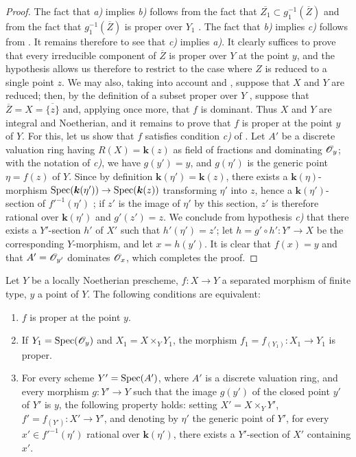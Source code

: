 \begin{proof}
The fact that \emph{a)} implies \emph{b)} follows from the fact that $\overline{Z_1}\subset g_1^{-1}(\overline{Z})$ and from the fact that $g_1^{-1}(\overline{Z})$ is proper over $Y_1$ .
The fact that \emph{b)} implies \emph{c)} follows from .
It remains therefore to see that \emph{c)} implies \emph{a)}.
It clearly suffices to prove that every irreducible component of $\overline{Z}$ is proper over $Y$ at the point $y$, and the hypothesis allows us therefore to restrict to the case where $Z$ is reduced to a single point $z$.
We may also, taking into account  and , suppose that $X$ and $Y$ are reduced; then, by the definition of a subset proper over $Y$ , suppose that $\overline{Z}=X=\overline{\{z\}}$ and, applying  once more, that $f$ is dominant. Thus $X$ and $Y$ are integral and Noetherian, and it remains to prove that $f$ is proper at the point $y$ of $Y$. For this, let us show that $f$ satisfies condition \emph{c)} of .
Let $A'$ be a discrete valuation ring having $R(X)=\boldsymbol{k}(z)$ as field of fractions and dominating $\mathscr{O}_y$; with the notation of \emph{c)}, we have $g(y')=y$, and $g(\eta')$ is the generic point $\eta=f(z)$ of $Y$.
Since by definition $\boldsymbol{k}(\eta')=\boldsymbol{k}(z)$, there exists a $\boldsymbol{k}(\eta)$-morphism $\operatorname{Spec}(\boldsymbol{k}(\eta'))\to\operatorname{Spec}(\boldsymbol{k}(z))$ transforming $\eta'$ into $z$, hence a $\boldsymbol{k}(\eta')$-section of $f'^{-1}(\eta')$ ; if $z'$ is the image of $\eta'$ by this section, $z'$ is therefore rational over $\boldsymbol{k}(\eta')$ and $g'(z')=z$.
We conclude from hypothesis \emph{c)} that there exists a $Y'$-section $h'$ of $X'$ such that $h'(\eta')=z'$; let $h=g'\circ h':Y'\to X$ be the corresponding $Y$-morphism, and let $x=h(y')$. It is clear that $f(x)=y$ and that $A'=\mathscr{O}_{y'}$ dominates $\mathscr{O}_x$, which completes the proof.
\end{proof}

\begin{corollary}[15.7.5]
\label{IV.15.7.5}
Let $Y$ be a locally Noetherian prescheme, $f:X\to Y$ a separated morphism of finite type, $y$ a point of $Y$.
The following conditions are equivalent:
\begin{enumerate}[label=\emph{\alph*)}]
  \item $f$ is proper at the point $y$.
  \item If $Y_1=\operatorname{Spec}(\mathscr{O}_y)$ and $X_1=X\times_Y Y_1$, the morphism $f_1=f_{(Y_1)}:X_1\to Y_1$ is proper.
  \item For every scheme $Y'=\operatorname{Spec}(A')$, where $A'$ is a discrete valuation ring, and every morphism $g:Y'\to Y$ such that the image $g(y')$ of the closed point $y'$ of $Y'$ is $y$, the following property holds: setting $X'=X\times_Y Y'$, $f'=f_{(Y')}:X'\to Y'$, and denoting by $\eta'$ the generic point of $Y'$, for every $x'\in f'^{-1}(\eta')$ rational over $\boldsymbol{k}(\eta')$, there exists a $Y'$-section of $X'$ containing $x'$.
\end{enumerate}
\end{corollary}

